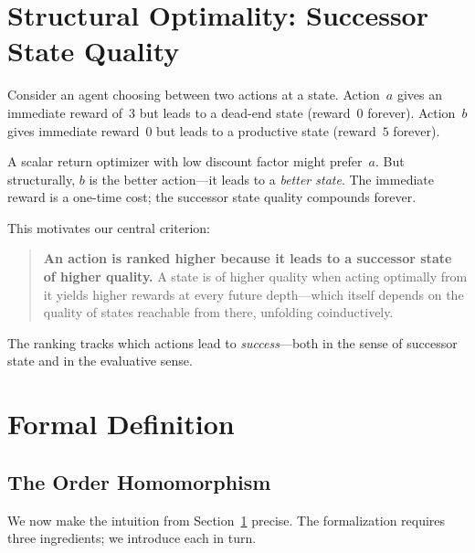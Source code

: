\documentclass[9pt,a4paper]{article}
\theoremstyle{plain}
\theoremstyle{definition}
\theoremstyle{remark}
\begin{document}

\section{Structural Optimality: Successor State Quality}\label{sec:key-idea}

Consider an agent choosing between two actions at a state.  Action~$a$ gives an immediate reward of~$3$ but leads to a dead-end state (reward~$0$ forever).  Action~$b$ gives immediate reward~$0$ but leads to a productive state (reward~$5$ forever).

A scalar return optimizer with low discount factor might prefer~$a$.  But structurally, $b$ is the better action---it leads to a \emph{better state}.  The immediate reward is a one-time cost; the successor state quality compounds forever.

This motivates our central criterion:

\begin{quote}
\textbf{An action is ranked higher because it leads to a successor state of higher quality.}  A state is of higher quality when acting optimally from it yields higher rewards at every future depth---which itself depends on the quality of states reachable from there, unfolding coinductively.
\end{quote}

The ranking tracks which actions lead to \emph{success}---both in the sense of successor state and in the evaluative sense.


\section{Formal Definition}

\subsection{The Order Homomorphism}

We now make the intuition from Section~\ref{sec:key-idea} precise.  The formalization requires three ingredients; we introduce each in turn.
\end{document}
